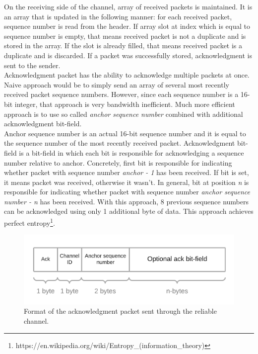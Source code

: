 \documentclass[times, utf8, diplomski]{fer}
\begin{document}
On the receiving side of the channel, array of received packets is maintained. It is an array that is updated in the following manner: for each received packet, sequence number is read from the header. If array slot at index which is equal to sequence number is empty, that means received packet is not a duplicate and is stored in the array. If the slot is already filled, that means received packet is a duplicate and is discarded. If a packet was successfully stored, acknowledgment is sent to the sender. \\

Acknowledgment packet has the ability to acknowledge multiple packets at once. Naive approach would be to simply send an array of several most recently received packet sequence numbers. However, since each sequence number is a 16-bit integer, that approach is very bandwidth inefficient. Much more efficient approach is to use so called \textit{anchor sequence number} combined with additional acknowledgment bit-field. \\

Anchor sequence number is an actual 16-bit sequence number and it is equal to the sequence number of the most recently received packet. Acknowledgment bit-field is a bit-field in which each bit is responsible for acknowledging a sequence number relative to anchor. Concretely, first bit is responsible for indicating whether packet with sequence number \textit{anchor - 1} has been received. If bit is set, it means packet was received, otherwise it wasn't. In general, bit at position \textit{n} is responsible for indicating whether packet with sequence number \textit{anchor sequence number - n} has been received. With this approach, 8 previous sequence numbers can be acknowledged using only 1 additional byte of data. This approach achieves perfect entropy\footnote{https://en.wikipedia.org/wiki/Entropy\_(information\_theory)}.\\

\begin{figure}[H]
	\centering
	\includegraphics[scale=0.25]{Ack-packet-structure}
	\caption{Format of the acknowledgment packet sent through the reliable channel.}
\end{figure}
\end{document}
